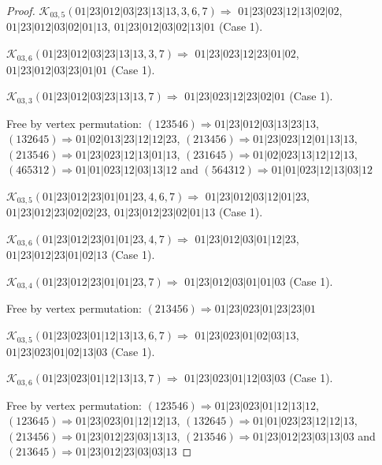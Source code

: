 \documentclass[12pt]{article}
\theoremstyle{plain}
\theoremstyle{definition}
\theoremstyle{remark}
\newcommand{\fancy}[1]{\mathcal{#1}}
\def\K{\fancy{K}}
\begin{document}
\begin{proof}
	
	
	\bigskip
	
	$\K_{03,5}(01|23|012|03|23|13|13,3, 6, 7)\Rightarrow $ $01|23|023|12|13|02|02$, $01|23|012|03|02|01|13$, $01|23|012|03|02|13|01$ (Case 1).
	
	$\K_{03,6}(01|23|012|03|23|13|13,3, 7)\Rightarrow $ $01|23|023|12|23|01|02$, $01|23|012|03|23|01|01$ (Case 1).
	
	$\K_{03,3}(01|23|012|03|23|13|13,7)\Rightarrow $ $01|23|023|12|23|02|01$ (Case 1).
	
	
	
	Free by vertex permutation: $(1 2 3 5 4 6)\Rightarrow 01|23|012|03|13|23|13$, $(1 3 2 6 4 5)\Rightarrow 01|02|013|23|12|12|23$, $(2 1 3 4 5 6)\Rightarrow 01|23|023|12|01|13|13$, $(2 1 3 5 4 6)\Rightarrow 01|23|023|12|13|01|13$, $(2 3 1 6 4 5)\Rightarrow 01|02|023|13|12|12|13$, $(4 6 5 3 1 2)\Rightarrow 01|01|023|12|03|13|12$ and $(5 6 4 3 1 2)\Rightarrow 01|01|023|12|13|03|12$
	
	
	
	\bigskip
	
	$\K_{03,5}(01|23|012|23|01|01|23,4, 6, 7)\Rightarrow $ $01|23|012|03|12|01|23$, $01|23|012|23|02|02|23$, $01|23|012|23|02|01|13$ (Case 1).
	
	$\K_{03,6}(01|23|012|23|01|01|23,4, 7)\Rightarrow $ $01|23|012|03|01|12|23$, $01|23|012|23|01|02|13$ (Case 1).
	
	$\K_{03,4}(01|23|012|23|01|01|23,7)\Rightarrow $ $01|23|012|03|01|01|03$ (Case 1).
	
	
	
	Free by vertex permutation: $(2 1 3 4 5 6)\Rightarrow 01|23|023|01|23|23|01$
	
	
	
	\bigskip
	
	$\K_{03,5}(01|23|023|01|12|13|13,6, 7)\Rightarrow $ $01|23|023|01|02|03|13$, $01|23|023|01|02|13|03$ (Case 1).
	
	$\K_{03,6}(01|23|023|01|12|13|13,7)\Rightarrow $ $01|23|023|01|12|03|03$ (Case 1).
	
	
	
	Free by vertex permutation: $(1 2 3 5 4 6)\Rightarrow 01|23|023|01|12|13|12$, $(1 2 3 6 4 5)\Rightarrow 01|23|023|01|12|12|13$, $(1 3 2 6 4 5)\Rightarrow 01|01|023|23|12|12|13$, $(2 1 3 4 5 6)\Rightarrow 01|23|012|23|03|13|13$, $(2 1 3 5 4 6)\Rightarrow 01|23|012|23|03|13|03$ and $(2 1 3 6 4 5)\Rightarrow 01|23|012|23|03|03|13$
	
	
	
	\bigskip
	

\end{proof}
\end{document}
